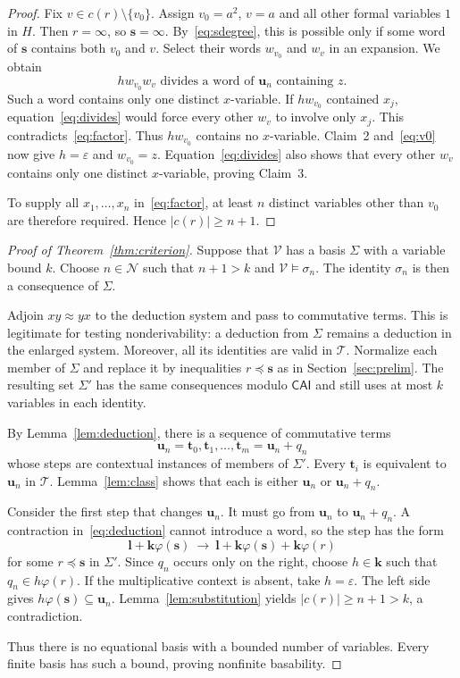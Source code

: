 \documentclass[10pt,a4paper]{amsart}
\newcommand{\CAI}{\mathsf{CAI}}
\newcommand{\T}{\mathcal T}
\newcommand{\Ncal}{\mathcal N}
\newcommand{\eps}{\varepsilon}
\newcommand{\bu}{\mathbf u}
\newcommand{\bs}{\mathbf s}
\newcommand{\bt}{\mathbf t}
\newcommand{\bK}{\mathbf k}
\numberwithin{equation}{section}
\begin{document}
\begin{proof}
Fix $v\in c(r)\setminus\{v_0\}$. Assign $v_0=a^2$, $v=a$ and all
other formal variables $1$ in $H$. Then $r=\infty$, so $\bs=\infty$.
By~\eqref{eq:sdegree}, this is possible only if some word of $\bs$
contains both $v_0$ and $v$. Select their words $w_{v_0}$ and $w_v$ in
an expansion. We obtain
\begin{equation}\label{eq:divides}
hw_{v_0}w_v\text{ divides a word of $\bu_n$ containing $z$.}
\end{equation}
Such a word contains only one distinct $x$-variable. If $hw_{v_0}$
contained $x_j$, equation~\eqref{eq:divides} would force every other
$w_v$ to involve only $x_j$. This contradicts~\eqref{eq:factor}.
Thus $hw_{v_0}$ contains no $x$-variable. Claim~2 and~\eqref{eq:v0}
now give $h=\eps$ and $w_{v_0}=z$. Equation~\eqref{eq:divides} also
shows that every other $w_v$ contains only one distinct $x$-variable,
proving Claim~3.

To supply all $x_1,\ldots,x_n$ in~\eqref{eq:factor}, at least $n$
distinct variables other than $v_0$ are therefore required. Hence
$|c(r)|\geq n+1$.
\end{proof}


\begin{proof}[Proof of Theorem~\ref{thm:criterion}]
Suppose that $\mathcal V$ has a basis $\Sigma$ with a variable bound $k$.
Choose $n\in\Ncal$ such that $n+1>k$ and $\mathcal V\models\sigma_n$.
The identity $\sigma_n$ is then a consequence of $\Sigma$.

Adjoin $xy\approx yx$ to the deduction system and pass to commutative
terms. This is legitimate for testing nonderivability: a deduction from
$\Sigma$ remains a deduction in the enlarged system. Moreover, all its
identities are valid in $\T$. Normalize each member of $\Sigma$ and
replace it by inequalities $r\preceq\bs$ as in Section~\ref{sec:prelim}.
The resulting set $\Sigma'$ has the same consequences modulo $\CAI$
and still uses at most $k$ variables in each identity.

By Lemma~\ref{lem:deduction}, there is a sequence of commutative terms
\[
\bu_n=\bt_0,\bt_1,\ldots,\bt_m=\bu_n+q_n
\]
whose steps are contextual instances of members of $\Sigma'$. Every
$\bt_i$ is equivalent to $\bu_n$ in $\T$. Lemma~\ref{lem:class} shows
that each is either $\bu_n$ or $\bu_n+q_n$.

Consider the first step that changes $\bu_n$. It must go from
$\bu_n$ to $\bu_n+q_n$. A contraction in~\eqref{eq:deduction} cannot
introduce a word, so the step has the form
\[
\mathbf l+\bK\varphi(\bs)
\ \longrightarrow\
\mathbf l+\bK\varphi(\bs)+\bK\varphi(r)
\]
for some $r\preceq\bs$ in $\Sigma'$. Since $q_n$ occurs only on the
right, choose $h\in\bK$ such that $q_n\in h\varphi(r)$. If the
multiplicative context is absent, take $h=\eps$. The left side gives
$h\varphi(\bs)\subseteq\bu_n$. Lemma~\ref{lem:substitution} yields
$|c(r)|\geq n+1>k$, a contradiction.

Thus there is no equational basis with a bounded number of variables.
Every finite basis has such a bound, proving nonfinite basability.
\end{proof}
\end{document}
